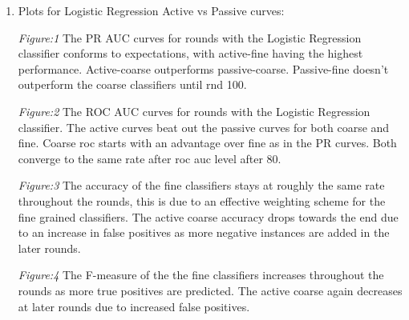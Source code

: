 \documentclass[11pt]{article}   	%
\begin{document}
\begin{enumerate}[ label=\textbf{\Roman*.},listparindent=1.5em]
\item Plots for Logistic Regression Active vs Passive curves: \\%
\begin{center}	
\par \textit{Figure:1}  The PR AUC curves for rounds with the Logistic
Regression classifier conforms to expectations, with active-fine having
the highest performance. Active-coarse outperforms passive-coarse. Passive-fine
doesn't outperform the coarse classifiers until rnd 100. \\
\par \textit{Figure:2}  The ROC AUC curves for rounds with the
Logistic Regression classifier. The active curves beat out the passive
curves for both coarse and fine. Coarse roc starts with an advantage over
fine as in the PR curves. Both converge to the same rate after roc auc level after 80.\\
\par \textit{Figure:3}  The accuracy of the fine classifiers stays at
roughly the same rate throughout the rounds, this is due to an effective
weighting scheme for the fine grained classifiers. The active coarse accuracy
drops towards the end due to an increase in false positives as more negative
instances are added in the later rounds.\\
\par \textit{Figure:4}  The F-measure of the the fine classifiers increases
throughout the rounds as more true positives are predicted. The active coarse
again decreases at later rounds due to increased false positives.\\
\end{center}
\break






\end{enumerate}
\end{document}
